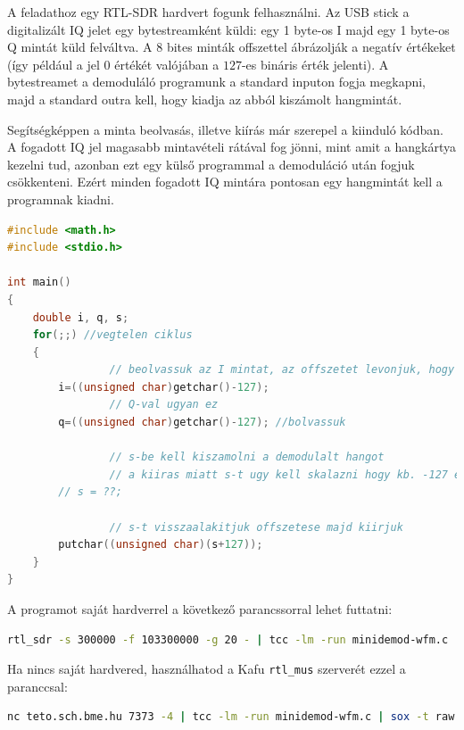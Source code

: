 \documentclass[12pt,a4paper]{article}
\begin{document}
A feladathoz egy RTL-SDR hardvert fogunk felhasználni.
Az USB stick a digitalizált IQ jelet egy bytestreamként küldi: egy 1 byte-os I majd egy 1 byte-os Q mintát küld felváltva.
A 8 bites minták offszettel ábrázolják a negatív értékeket (így például a jel $0$ értékét valójában a $127$-es bináris érték jelenti).
A bytestreamet a demoduláló programunk a standard inputon fogja megkapni, majd a standard outra kell, hogy kiadja az abból kiszámolt hangmintát.

Segítségképpen a minta beolvasás, illetve kiírás már szerepel a kiinduló kódban.
A fogadott IQ jel magasabb mintavételi rátával fog jönni, mint amit a hangkártya kezelni tud, azonban ezt egy külső programmal a demoduláció után fogjuk csökkenteni.
Ezért minden fogadott IQ mintára pontosan egy hangmintát kell a programnak kiadni.

\begin{lstlisting}[frame=single,language=c,caption=Kiinduló kód]
#include <math.h>
#include <stdio.h>

int main()
{
	double i, q, s;
	for(;;) //vegtelen ciklus
	{
                // beolvassuk az I mintat, az offszetet levonjuk, hogy a 0 tenyleg 0 legyen
		i=((unsigned char)getchar()-127); 
                // Q-val ugyan ez
		q=((unsigned char)getchar()-127); //bolvassuk
	
                // s-be kell kiszamolni a demodulalt hangot
                // a kiiras miatt s-t ugy kell skalazni hogy kb. -127 es 128 koze essen.
		// s = ??;

                // s-t visszaalakitjuk offszetese majd kiirjuk
		putchar((unsigned char)(s+127));
	}
}
\end{lstlisting}

\clearpage
A programot saját hardverrel a következő parancssorral lehet futtatni:
\begin{lstlisting}[frame=single,language=bash]
 rtl_sdr -s 300000 -f 103300000 -g 20 - | tcc -lm -run minidemod-wfm.c | sox -t raw -r 300000 -e unsigned -b 8 -c 1 - -t raw - rate 48000 sinc -15k | aplay -f U8 -c1 -r 48000 --buffer-size=200000
\end{lstlisting}

Ha nincs saját hardvered, használhatod a Kafu \texttt{rtl\_mus} szerverét ezzel a paranccsal:
\begin{lstlisting}[frame=single,language=bash]
nc teto.sch.bme.hu 7373 -4 | tcc -lm -run minidemod-wfm.c | sox -t raw -r 300000 -e unsigned -b 8 -c 1 - -t raw - rate 48000 sinc -15k | aplay -f U8 -c1 -r 48000 --buffer-size=200000
\end{lstlisting}
\end{document}
